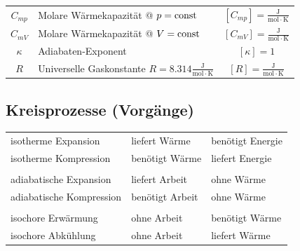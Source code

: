 \begin{tabular}{c l c}
	\rule{0pt}{10pt}$C_{mp}$ & Molare Wärmekapazität @ $p = \mathrm{const}$ & $[C_{mp}] = \mathrm{\frac{J}{mol \cdot K}}$ \\
	\rule{0pt}{10pt}$C_{mV}$ & Molare Wärmekapazität @ $V = \mathrm{const}$  & $[C_{mV}] = \mathrm{\frac{J}{mol \cdot K}}$ \\
	\rule{0pt}{10pt}$\kappa$ & Adiabaten-Exponent & $[\kappa] = 1$ \\
	\rule{0pt}{10pt}$R$ & Universelle Gaskonstante $R = 8.314 \mathrm{\frac{J}{mol \cdot K}}$ & $[R] = \mathrm{\frac{J}{mol \cdot K}} $ \\
\end{tabular}



\subsection{Kreisprozesse (Vorgänge)}


\begin{tabular}{lll}
isotherme Expansion & liefert Wärme & benötigt Energie \\
isotherme Kompression & benötigt Wärme & liefert Energie \\
\\
adiabatische Expansion & liefert Arbeit & ohne Wärme \\
adiabatische Kompression & benötigt Arbeit & ohne Wärme \\
\\
isochore Erwärmung & ohne Arbeit & benötigt Wärme \\
isochore Abkühlung & ohne Arbeit & liefert Wärme \\

\end{tabular}


